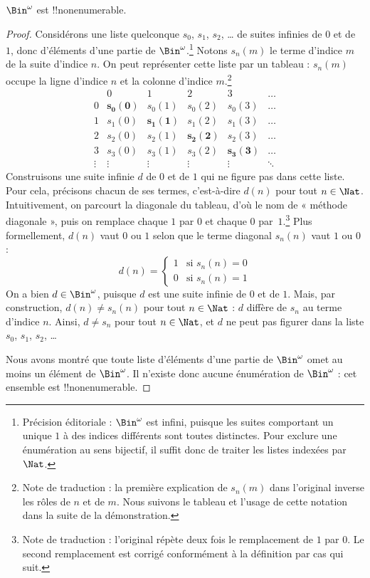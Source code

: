 \documentclass[11pt,a4paper,openany]{memoir}
\begin{document}
\begin{thm}
$\Bin^\omega$ est !!{nonenumerable}.
\end{thm}

\begin{proof}
Considérons une liste quelconque $s_{0}$, $s_{1}$, $s_{2}$, \dots{}
de suites infinies de $0$ et de~$1$, donc d'éléments d'une partie
de $\Bin^\omega$.\footnote{Précision éditoriale : $\Bin^\omega$
est infini, puisque les suites comportant un unique $1$ à des
indices différents sont toutes distinctes. Pour exclure une
énumération au sens bijectif, il suffit donc de traiter les listes
indexées par $\Nat$.}
Notons $s_n(m)$ le terme d'indice $m$ de la suite d'indice $n$.
On peut représenter cette liste par un tableau : $s_n(m)$ occupe
la ligne d'indice $n$ et la colonne d'indice $m$.\footnote{Note de
traduction : la première explication de $s_n(m)$ dans l'original
inverse les rôles de $n$ et de $m$. Nous suivons le tableau et
l'usage de cette notation dans la suite de la démonstration.}
\[
\begin{array}{c|c|c|c|c|c}
& 0 & 1 & 2 & 3 & \dots \\\hline
0 & \mathbf{s_{0}(0)} & s_{0}(1) & s_{0}(2) & s_0(3) & \dots \\\hline
1 & s_{1}(0)& \mathbf{s_{1}(1)} & s_1(2) & s_1(3) & \dots \\\hline
2 & s_{2}(0)& s_{2}(1) & \mathbf{s_2(2)} & s_2(3) & \dots \\\hline
3 & s_{3}(0)& s_{3}(1) & s_3(2) & \mathbf{s_3(3)} & \dots \\\hline
\vdots & \vdots & \vdots & \vdots & \vdots & \mathbf{\ddots}
\end{array}
\]
Construisons une suite infinie $d$ de $0$ et de $1$ qui ne figure
pas dans cette liste. Pour cela, précisons chacun de ses termes,
c'est-à-dire $d(n)$ pour tout $n \in \Nat$. Intuitivement, on
parcourt la diagonale du tableau, d'où le nom de « méthode
diagonale », puis on remplace chaque $1$ par $0$ et chaque $0$
par~$1$.\footnote{Note de traduction : l'original répète deux fois
le remplacement de $1$ par $0$. Le second remplacement est
corrigé conformément à la définition par cas qui suit.}
Plus formellement, $d(n)$ vaut $0$ ou $1$ selon que le terme
diagonal $s_n(n)$ vaut $1$ ou $0$ :
\[
d(n) =
\begin{cases}
1 & \text{si $s_{n}(n) = 0$}\\
0 & \text{si $s_{n}(n) = 1$}
\end{cases}
\]
On a bien $d \in \Bin^\omega$, puisque $d$ est une suite infinie
de $0$ et de $1$. Mais, par construction, $d(n) \neq s_n(n)$
pour tout $n \in \Nat$ : $d$ diffère de $s_n$ au terme d'indice
$n$. Ainsi, $d \neq s_n$ pour tout $n\in \Nat$, et $d$ ne
peut pas figurer dans la liste $s_0$, $s_1$, $s_2$, \dots

Nous avons montré que toute liste d'éléments d'une partie de
$\Bin^\omega$ omet au moins un élément de $\Bin^\omega$.
Il n'existe donc aucune énumération de $\Bin^\omega$ : cet
ensemble est !!{nonenumerable}.
\end{proof}
\end{document}
